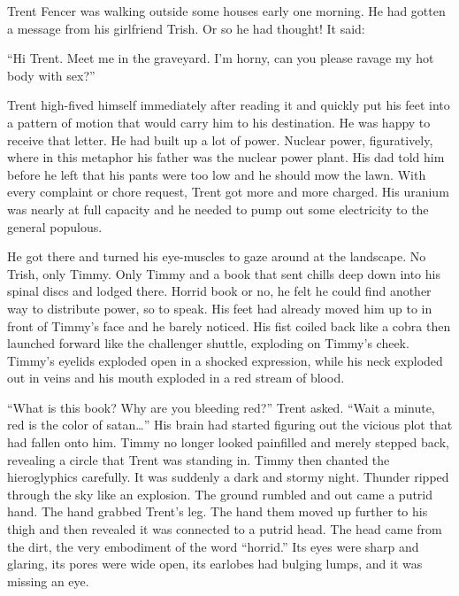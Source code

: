Trent Fencer was walking outside some houses early one morning. He
had gotten a message from his girlfriend Trish. Or so he had
thought! It said:



``Hi Trent. Meet me in the graveyard. I'm horny, can you please
ravage my hot body with sex?''



Trent high-fived himself immediately after reading it and quickly
put his feet into a pattern of motion that would carry him to his
destination. He was happy to receive that letter. He had built up a
lot of power. Nuclear power, figuratively, where in this metaphor
his father was the nuclear power plant. His dad told him before he
left that his pants were too low and he should mow the lawn. With
every complaint or chore request, Trent got more and more charged.
His uranium was nearly at full capacity and he needed to pump out
some electricity to the general populous.



He got there and turned his eye-muscles to gaze around at the
landscape. No Trish, only Timmy. Only Timmy and a book that sent
chills deep down into his spinal discs and lodged there. Horrid
book or no, he felt he could find another way to distribute power,
so to speak. His feet had already moved him up to in front of
Timmy's face and he barely noticed. His fist coiled back like a
cobra then launched forward like the challenger shuttle, exploding
on Timmy's cheek. Timmy's eyelids exploded open in a shocked
expression, while his neck exploded out in veins and his mouth
exploded in a red stream of blood.



``What is this book? Why are you bleeding red?'' Trent asked. ``Wait a
minute, red is the color of satan{\ldots}'' His brain had started
figuring out the vicious plot that had fallen onto him. Timmy no
longer looked painfilled and merely stepped back, revealing a
circle that Trent was standing in. Timmy then chanted the
hieroglyphics carefully. It was suddenly a dark and stormy night.
Thunder ripped through the sky like an explosion. The ground
rumbled and out came a putrid hand. The hand grabbed Trent's leg.
The hand them moved up further to his thigh and then revealed it
was connected to a putrid head. The head came from the dirt, the
very embodiment of the word ``horrid.'' Its eyes were sharp and
glaring, its pores were wide open, its earlobes had bulging lumps,
and it was missing an eye.




